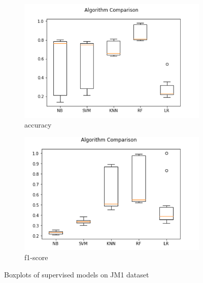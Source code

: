 \begin{figure}[h!]
  \centering
  \begin{subfigure}[b]{0.4\linewidth}
    \includegraphics[width=\linewidth]{report/JM1.png}
    \caption{accuracy}
  \end{subfigure}
  \begin{subfigure}[b]{0.4\linewidth}
    \includegraphics[width=\linewidth]{report/JM1_f.png}
    \caption{f1-score}
  \end{subfigure}
  \caption{Boxplots of supervised models on JM1 dataset}
\end{figure}

